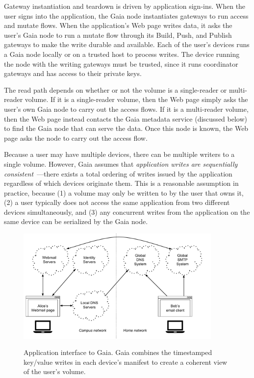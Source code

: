 Gateway instantiation and teardown is driven by application sign-ins.
When the user signs into the application, the Gaia node instantiates gateways to
run access and mutate flows.  When the application's Web page writes data,
it asks the user's Gaia node to run a mutate flow through its Build, Push, and
Publish gateways to make the write durable and available.
Each of the user's devices runs a Gaia node locally or on a trusted host to
process writes.  The device running the node with the writing gateways
must be trusted, since it runs coordinator gateways and has access to their
private keys.

The read path depends on whether or not the volume is a single-reader or
multi-reader volume.  If it is a single-reader volume, then the Web page simply
asks the user's own Gaia node to carry out the access flows.  If it is a
multi-reader volume, then the Web page instead contacts the Gaia metadata
service (discussed below) to find the Gaia node that can serve the data.
Once this node is known, the Web page asks the node to
carry out the access flow.

Because a user may have multiple devices, there can be multiple writers to
a single volume.  However, Gaia assumes that \emph{application writes are
sequentially consistent}~\cite{sequential-consistency}---there exists a total
ordering of writes issued by the application regardless of which devices
originate them.  This is a reasonable assumption in practice, because
(1) a volume may only be written to by the user
that owns it, (2) a user typically does not access the same application from
two different devices simultaneously, and (3) any concurrent writes from the
application on the same device can be serialized by the Gaia node.

\begin{figure}[h]
   \caption{Application interface to Gaia.  Gaia combines the timestamped
   key/value writes in each device's manifest to create a coherent view of the
   user's volume.}
   \centering
   \includegraphics[width=0.9\textwidth,page=17]{figures/dissertation-figures}
   \label{fig:chap3-gaia-global-key-value-store}
\end{figure}

